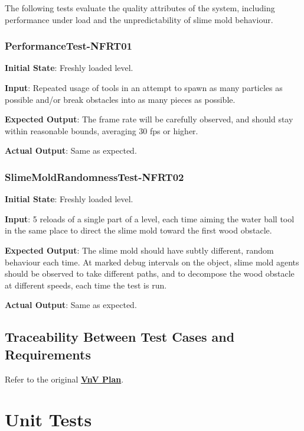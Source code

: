 \documentclass[12pt, titlepage]{article}
\begin{document}
The following tests evaluate the quality attributes of the system, including performance under load and the unpredictability of slime mold behaviour.

\subsubsection{PerformanceTest-NFRT01}

\textbf{Initial State}: Freshly loaded level.

\textbf{Input}: Repeated usage of tools in an attempt to spawn as many particles
as possible and/or break obstacles into as many pieces as possible.

\textbf{Expected Output}: The frame rate will be carefully observed, and
should stay within reasonable bounds, averaging 30 fps or higher.

\textbf{Actual Output}: Same as expected.



\subsubsection{SlimeMoldRandomnessTest-NFRT02}

\textbf{Initial State}: Freshly loaded level.

\textbf{Input}: 5 reloads of a single part of a level, each time aiming
the water ball tool in the same place to direct the slime mold toward the first
wood obstacle.

\textbf{Expected Output}: The slime mold should have subtly different, random behaviour each time. At marked debug intervals on the object, slime mold agents should be observed to take different paths, and to decompose the wood obstacle at different speeds, each time the test is run.

\textbf{Actual Output}: Same as expected.



\subsection{Traceability Between Test Cases and Requirements}
Refer to the original
\href{https://github.com/felix-hurst/Ad-Natura/blob/main/docs/VnVPlan/VnVPlan.pdf}{\bf{VnV Plan}}.

\section{Unit Tests}\label{unittests}
\end{document}
